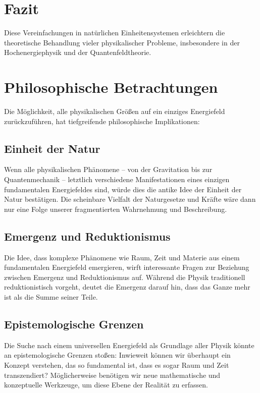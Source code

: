 \documentclass{article}
\begin{document}
\section{Fazit}
Diese Vereinfachungen in natürlichen Einheitensystemen erleichtern die theoretische Behandlung vieler physikalischer Probleme, insbesondere in der Hochenergiephysik und der Quantenfeldtheorie.



\section{Philosophische Betrachtungen}

Die Möglichkeit, alle physikalischen Größen auf ein einziges Energiefeld zurückzuführen, hat tiefgreifende philosophische Implikationen:

\subsection{Einheit der Natur}

Wenn alle physikalischen Phänomene – von der Gravitation bis zur Quantenmechanik – letztlich verschiedene Manifestationen eines einzigen fundamentalen Energiefeldes sind, würde dies die antike Idee der Einheit der Natur bestätigen. Die scheinbare Vielfalt der Naturgesetze und Kräfte wäre dann nur eine Folge unserer fragmentierten Wahrnehmung und Beschreibung.

\subsection{Emergenz und Reduktionismus}

Die Idee, dass komplexe Phänomene wie Raum, Zeit und Materie aus einem fundamentalen Energiefeld emergieren, wirft interessante Fragen zur Beziehung zwischen Emergenz und Reduktionismus auf. Während die Physik traditionell reduktionistisch vorgeht, deutet die Emergenz darauf hin, dass das Ganze mehr ist als die Summe seiner Teile.

\subsection{Epistemologische Grenzen}

Die Suche nach einem universellen Energiefeld als Grundlage aller Physik könnte an epistemologische Grenzen stoßen: Inwieweit können wir überhaupt ein Konzept verstehen, das so fundamental ist, dass es sogar Raum und Zeit transzendiert? Möglicherweise benötigen wir neue mathematische und konzeptuelle Werkzeuge, um diese Ebene der Realität zu erfassen.
\end{document}
